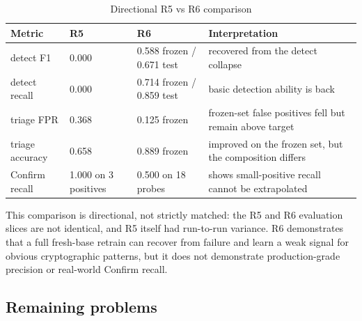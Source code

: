 \documentclass[11pt]{article}
\begin{document}
\begin{table}[h]
\centering
\caption{Directional R5 vs R6 comparison}
\label{tab:r5-r6-en}
\small
\begin{tabularx}{\linewidth}{L{3.2cm}L{2.6cm}L{2.9cm}Y}
\toprule
\textbf{Metric} & \textbf{R5} & \textbf{R6} & \textbf{Interpretation} \\
\midrule
detect F1 & 0.000 & 0.588 frozen / 0.671 test & recovered from the detect collapse \\
detect recall & 0.000 & 0.714 frozen / 0.859 test & basic detection ability is back \\
triage FPR & 0.368 & 0.125 frozen & frozen-set false positives fell but remain above target \\
triage accuracy & 0.658 & 0.889 frozen & improved on the frozen set, but the composition differs \\
Confirm recall & 1.000 on 3 positives & 0.500 on 18 probes & shows small-positive recall cannot be extrapolated \\
\bottomrule
\end{tabularx}
\end{table}

This comparison is directional, not strictly matched: the R5 and R6 evaluation slices are not identical, and
R5 itself had run-to-run variance. R6 demonstrates that a full fresh-base retrain can recover from failure and
learn a weak signal for obvious cryptographic patterns, but it does not demonstrate production-grade precision
or real-world Confirm recall.

\subsection{Remaining problems}
\end{document}
